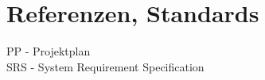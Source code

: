 \chapter{Referenzen, Standards}
PP - Projektplan\\
SRS - System Requirement Specification

\begin{appendix}










\end{appendix}
